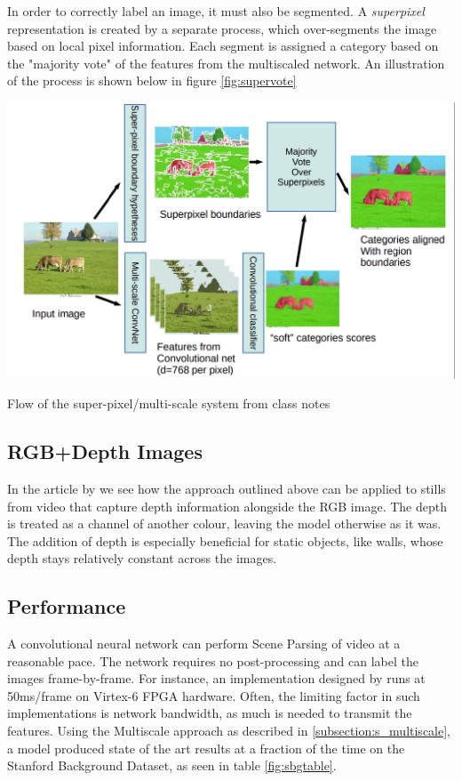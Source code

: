 In order to correctly label an image, it must also be segmented.  
A \textit{superpixel} representation is created by a separate process, which over-segments the image based on local pixel information.
Each segment is assigned a category based on the "majority vote" of the features from the multiscaled network.  
An illustration of the process is shown below in figure \ref{fig:supervote}

\begin{table}[!ht]
  \includegraphics[width=\textwidth]{figs/SuperVote.png}
  \caption{Flow of the super-pixel/multi-scale system from class notes}
  \label{fig:supervote}
\end{table}


\subsection{RGB+Depth Images}\label{subsection:s_depth}
In the article by \cite{DBLP:journals/corr/abs-1301-3572} we see how the approach outlined above can be applied to stills from video that capture depth information alongside the RGB image.  
The depth is treated as a channel of another colour, leaving the model otherwise as it was. 
The addition of depth is especially beneficial for static objects, like walls, whose depth stays relatively constant across the images.  


\subsection{Performance} \label{subsection:s_performance}
A convolutional neural network can perform Scene Parsing of video at a reasonable pace.  
The network requires no post-processing and can label the images frame-by-frame.  For instance, an implementation designed by \cite{Farabet:2013:LHF:2498740.2498895} runs at 50ms/frame on Virtex-6 FPGA hardware.  
Often, the limiting factor in such implementations is network bandwidth, as much is needed to transmit the features.  
Using the Multiscale approach as described in \ref{subsection:s_multiscale}, a model produced state of the art results at a fraction of the time on the Stanford Background Dataset, as seen in table \ref{fig:sbgtable}.

